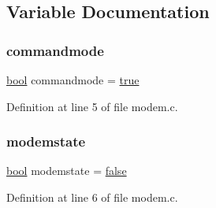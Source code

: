 \subsection{Variable Documentation}
\mbox{\label{a00044_aaf612f2f6c2c9931ab63296b3514a037_aaf612f2f6c2c9931ab63296b3514a037}} 
\subsubsection{\texorpdfstring{commandmode}{commandmode}}
{\footnotesize\ttfamily \hyperlink{a00140_af6a258d8f3ee5206d682d799316314b1_af6a258d8f3ee5206d682d799316314b1}{bool} commandmode = \hyperlink{a00140_af6a258d8f3ee5206d682d799316314b1_af6a258d8f3ee5206d682d799316314b1a08f175a5505a10b9ed657defeb050e4b}{true}}



Definition at line 5 of file modem.\+c.

\mbox{\label{a00044_a0105e5654e7f0fa503f2853c88a2f782_a0105e5654e7f0fa503f2853c88a2f782}} 
\subsubsection{\texorpdfstring{modemstate}{modemstate}}
{\footnotesize\ttfamily \hyperlink{a00140_af6a258d8f3ee5206d682d799316314b1_af6a258d8f3ee5206d682d799316314b1}{bool} modemstate = \hyperlink{a00140_af6a258d8f3ee5206d682d799316314b1_af6a258d8f3ee5206d682d799316314b1ae9de385ef6fe9bf3360d1038396b884c}{false}}



Definition at line 6 of file modem.\+c.

